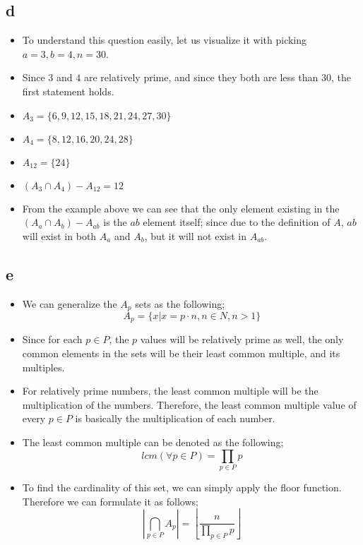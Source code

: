 \documentclass[12pt]{article}
\begin{document}
\subsection*{d}
\begin{itemize}
    \item To understand this question easily, let us visualize it with picking $a=3, b=4, n=30$.
    \item Since $3$ and $4$ are relatively prime, and since they both are less than $30$, the first statement holds.
    \item $A_3=\{6,9,12,15,18,21,24,27,30\}$
    \item $A_4=\{8,12,16,20,24,28\}$
    \item $A_{12}=\{24\}$
    \item $(A_3 \cap A_4) - A_{12} = {12}$
    \item From the example above we can see that the only element existing in the $(A_a \cap A_b) - A_{ab}$ is the $ab$ element itself; since due to the definition of $A$, $ab$ will exist in both $A_a$ and $A_b$, but it will not exist in $A_{ab}$. 
\end{itemize}
\subsection*{e}
\begin{itemize}
    \item We can generalize the $A_p$ sets as the following;
    $$ A_p=\{x | x = p \cdot n, n \in N, n > 1 \}$$
    \item Since for each $p \in P$, the $p$ values will be relatively prime as well, the only common elements in the sets will be their least common multiple, and its multiples.
    \item For relatively prime numbers, the least common multiple will be the multiplication of the numbers. Therefore, the least common multiple value of every $p \in P$ is basically the multiplication of each number. 
    \item The least common multiple can be denoted as the following;
    $$ lcm(\forall p \in P) = \prod\limits_{p \in P} p $$ 
    \item To find the cardinality of this set, we can simply apply the floor function. Therefore we can formulate it as follows;
    $$ \left\vert \bigcap\limits_{p \in P} A_p \right\vert = \left\lfloor \frac{n}{\prod\limits_{p \in P} p} \right\rfloor $$ 
\end{itemize}
\end{document}

